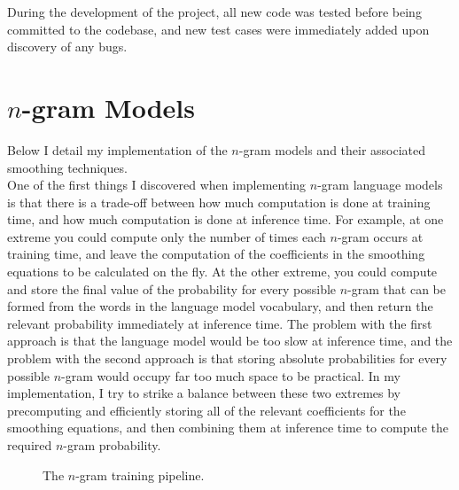 \documentclass[a4paper, 12pt]{report}
\newcommand{\ttt}[1]{\texttt{#1}}
\begin{document}
During the development of the project, all new code was tested before being committed to the codebase, and new test cases were immediately added upon discovery of any bugs.

\section{$n$-gram Models} \label{ngram_lm}

Below I detail my implementation of the $n$-gram models and their associated smoothing techniques. \\

One of the first things I discovered when implementing $n$-gram language models is that there is a trade-off between how much computation is done at training time, and how much computation is done at inference time. For example, at one extreme you could compute only the number of times each $n$-gram occurs at training time, and leave the computation of the coefficients in the smoothing equations to be calculated on the fly. At the other extreme, you could compute and store the final value of the probability for every possible $n$-gram that can be formed from the words in the language model vocabulary, and then return the relevant probability immediately at inference time. The problem with the first approach is that the language model would be too slow at inference time, and the problem with the second approach is that storing absolute probabilities for every possible $n$-gram would occupy far too much space to be practical. In my implementation, I try to strike a balance between these two extremes by precomputing and efficiently storing all of the relevant coefficients for the smoothing equations, and then combining them at inference time to compute the required $n$-gram probability. \\

\begin{figure}[h]
\captionsetup{justification=centering}
\centering
{}
\caption{The $n$-gram training pipeline.}
\label{fig:ngram_training}
\end{figure}
\end{document}
